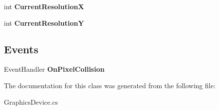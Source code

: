 \begin{DoxyCompactItemize}
\item 
\hypertarget{class_eimu_1_1_core_1_1_systems_1_1_s_chip8_1_1_graphics_device_a4d8bb2843acdf236e9c20270f3f8f417}{
int {\bfseries CurrentResolutionX}}
\label{class_eimu_1_1_core_1_1_systems_1_1_s_chip8_1_1_graphics_device_a4d8bb2843acdf236e9c20270f3f8f417}

\item 
\hypertarget{class_eimu_1_1_core_1_1_systems_1_1_s_chip8_1_1_graphics_device_a95f061806e80bcc7c67d4c01dad65ea2}{
int {\bfseries CurrentResolutionY}}
\label{class_eimu_1_1_core_1_1_systems_1_1_s_chip8_1_1_graphics_device_a95f061806e80bcc7c67d4c01dad65ea2}

\end{DoxyCompactItemize}
\subsection*{Events}
\begin{DoxyCompactItemize}
\item 
\hypertarget{class_eimu_1_1_core_1_1_systems_1_1_s_chip8_1_1_graphics_device_abccd2bedfbe957fed5ada1a583e51d47}{
EventHandler {\bfseries OnPixelCollision}}
\label{class_eimu_1_1_core_1_1_systems_1_1_s_chip8_1_1_graphics_device_abccd2bedfbe957fed5ada1a583e51d47}

\end{DoxyCompactItemize}


The documentation for this class was generated from the following file:\begin{DoxyCompactItemize}
\item 
GraphicsDevice.cs\end{DoxyCompactItemize}
